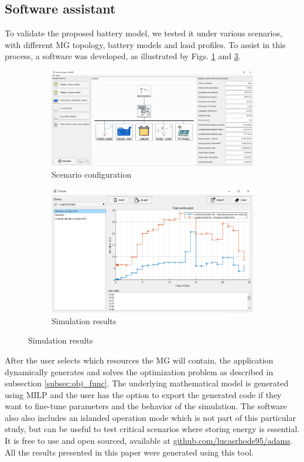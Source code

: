 \documentclass{ieeeaccess}
\begin{document}
    \subsection{Software assistant}
    To validate the proposed battery model, we tested it under various scenarios, with different \ac{MG} topology, battery models and load profiles. To assist in this process, a software was developed, as illustrated by Figs. \ref{fig:adams1} and \ref{fig:adams2}.
    \begin{figure}[!h]
    	\centering
    	\begin{subfigure}{0.45\textwidth}
    		\includegraphics[width=\linewidth]{figures/ss1.png}
    		\caption{Scenario configuration}
    		\label{fig:adams1}
    	\end{subfigure}
    	
    	\begin{subfigure}{0.45\textwidth}
    		\includegraphics[width=\linewidth]{figures/ss2.png}
    		\caption{Simulation results}
    		\label{fig:adams2}
    	\end{subfigure}
    \end{figure}
	After the user selects which resources the \ac{MG} will contain, the application dynamically generates and solves the optimization problem as described in subsection \ref{subsec:obj_func}. The underlying mathematical model is generated using \ac{MILP} and the user has the option to export the generated code if they want to fine-tune parameters and the behavior of the simulation. The software also also includes an islanded operation mode which is not part of this particular study, but can be useful to test critical scenarios where storing energy is essential. It is free to use and open sourced, available at \href{https://github.com/lucasrhode95/adams}{github.com/lucasrhode95/adams}. All the results presented in this paper were generated using this tool.
    
\end{document}
